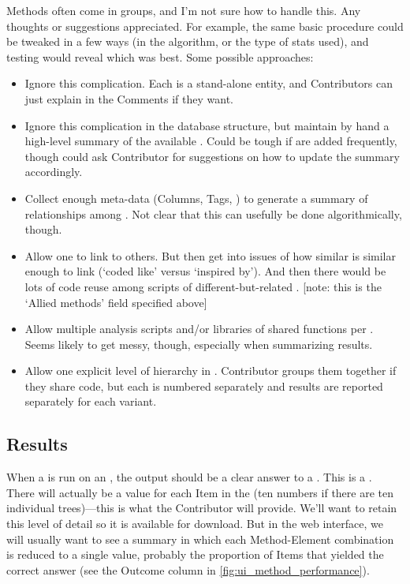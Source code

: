 Methods often come in groups, and I'm not sure how to handle this.
Any thoughts or suggestions appreciated.
For example, the same basic procedure could be tweaked in a few ways (in the algorithm, or the type of stats used), and testing would reveal which was best.
Some possible approaches:
\begin{itemize}
    \item Ignore this complication.
          Each \Method is a stand-alone entity, and Contributors can just explain in the Comments if they want.
    \item Ignore this complication in the database structure, but maintain by hand a high-level summary of the available \Methods.
          Could be tough if \Methods are added frequently, though could ask Contributor for suggestions on how to update the summary accordingly.
    \item Collect enough meta-data (Columns, Tags, \etc) to generate a summary of relationships among \Methods.
          Not clear that this can usefully be done algorithmically, though.
    \item Allow one \Method to link to others.
          But then get into issues of how similar is similar enough to link (\eg `coded like' versus `inspired by').
          And then there would be lots of code reuse among scripts of different-but-related \Methods.
          [note: this is the `Allied methods' field specified above]
    \item Allow multiple analysis scripts and/or libraries of shared functions per \Method.
          Seems likely to get messy, though, especially when summarizing results.
    \item Allow one explicit level of hierarchy in \Methods.
          Contributor groups them together if they share code, but each is numbered separately and results are reported separately for each variant.
\end{itemize}


\subsection{Results}
\label{sec:tables_result}

When a \Method is run on an \Element, the output should be a clear answer to a \Task.
This is a \Result.
There will actually be a value for each Item in the \Element (\eg ten numbers if there are ten individual trees)---this is what the Contributor will provide.
We'll want \phycomb to retain this level of detail so it is available for download.
But in the \phycomb web interface, we will usually want to see a summary in which each Method-Element combination is reduced to a single value, probably the proportion of Items that yielded the correct answer (see the Outcome column in \cref{fig:ui_method_performance}).

